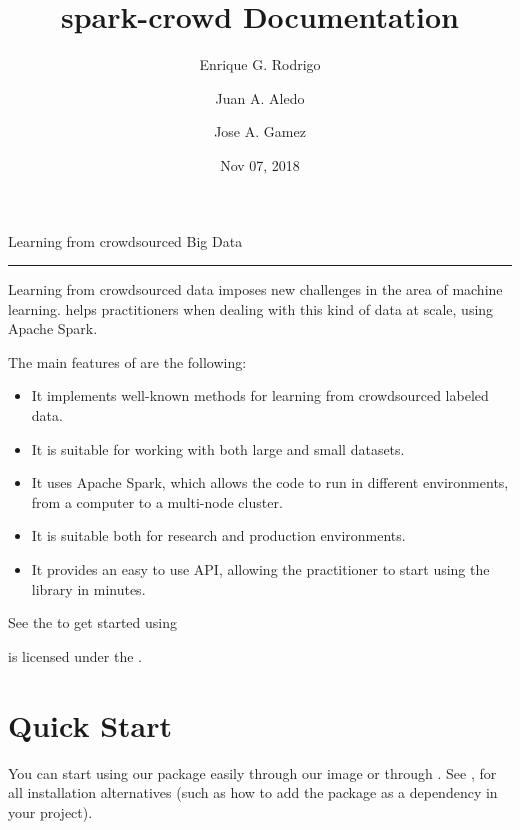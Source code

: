 \documentclass[letterpaper,10pt,english]{sphinxmanual}
\title{spark-crowd Documentation}
\date{Nov 07, 2018}
\author{Enrique G. Rodrigo \and Juan A. Aledo \and Jose A. Gamez}
\begin{document}
\pagestyle{empty}
\maketitle
\pagestyle{plain}
\sphinxtableofcontents
\pagestyle{normal}
\label{\detokenize{index::doc}}


Learning from crowdsourced Big Data


\bigskip\hrule\bigskip
Learning from crowdsourced data imposes new challenges
in the area of machine learning.  helps practitioners
when dealing with this kind of data at scale, using Apache Spark.

\noindent{}

The main features of  are the following:
\begin{itemize}
\item {} 
It implements well-known methods for learning from crowdsourced labeled data.

\item {} 
It is suitable for working with both large and small datasets.

\item {} 
It uses Apache Spark, which allows the code to run in different environments, from a computer to a multi-node cluster.

\item {} 
It is suitable both for research and production environments.

\item {} 
It provides an easy to use API, allowing the practitioner to start using the library in minutes.

\end{itemize}

See the {\hyperref[\detokenize{usage/quickstart:quickstart}]{}} to get started using 

 is licensed under the .





\chapter{Quick Start}
\label{\detokenize{usage/quickstart:quick-start}}\label{\detokenize{usage/quickstart:quickstart}}\label{\detokenize{usage/quickstart::doc}}
You can start using our package easily through our  image or through .
See {\hyperref[\detokenize{usage/installation:installation}]{}}, for all installation alternatives (such as how to add the package as a dependency in your project).
\end{document}
